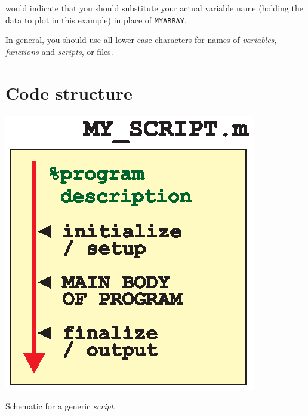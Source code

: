 \documentclass{tufte-book} %
\begin{document}
\noindent would indicate that you should substitute your actual variable name (holding the data to plot in this example) in place of \texttt{MYARRAY}.

In general, you should use all lower-case characters for names of \textit{variables}, \textit{functions} and \textit{scripts}, or files.
 

\section{Code structure}

\begin{marginfigure}[-0.0in]
\includegraphics[width=\linewidth]{ch0-script.eps}
\caption{Schematic for a generic \textit{script}.}
\label{fig:ch0-script}
\end{marginfigure}
\end{document}
